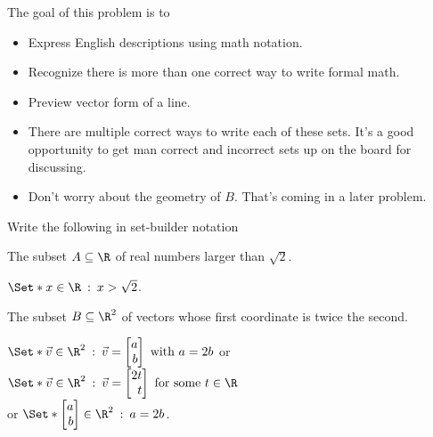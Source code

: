 	\bookonlynewpage
	\question
	\begin{annotation}
		\begin{goals}

			The goal of this problem is to
			\begin{itemize}
				\item Express English descriptions using math notation.
				\item Recognize there is more than one correct way to
					write formal math.
				\item Preview vector form of a line.
			\end{itemize}
		\end{goals}

		\begin{notes}
			\begin{itemize}
				\item There are multiple correct ways to write
					each of these sets. It's a good opportunity
					to get man correct and incorrect sets up on the
					board for discussing.
				\item Don't worry about the geometry of $B$. That's coming
					in a later problem.
			\end{itemize}
		\end{notes}
	\end{annotation}
		Write the following in set-builder notation
	\begin{parts}
			\item The subset $A\subseteq \R$ of real numbers larger than $\sqrt{2}$.
				\begin{solution}
					$\Set*{x\in\R \given x>\sqrt{2}}$.
				\end{solution}
			\item The subset $B\subseteq \R^2$ of vectors whose first coordinate
			is twice the second.
				\begin{solution}
					$\Set*{\vec v\in\R^2\given \vec v=\mat{a\\b}\text{ with }a=2b}$
					or
					$\Set*{\vec v\in\R^2\given\vec v=\mat{2t\\t}\text{ for some }t\in \R}$\\
					or
					$\Set*{\mat{a\\b}\in\R^2\given a=2b}$.
				\end{solution}
	\end{parts}

	\begin{bookonly}\end{bookonly}

